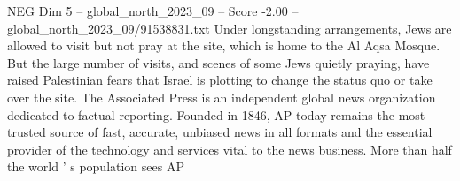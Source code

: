 \begin{textsample}{NEG Dim 5 – global\_north\_2023\_09 – Score -2.00 – global\_north\_2023\_09/91538831.txt}
Under longstanding arrangements, Jews are allowed to visit but not pray at the site, which is home to the Al Aqsa Mosque.
But the large number of visits, and scenes of some Jews quietly praying, have raised Palestinian fears that Israel is plotting to change the status quo or take over the site.
The Associated Press is an independent global news organization dedicated to factual reporting.
Founded in 1846, AP today remains the most trusted source of fast, accurate, unbiased news in all formats and the essential provider of the technology and services vital to the news business.
More than half the world ' s population sees AP

\end{textsample}
